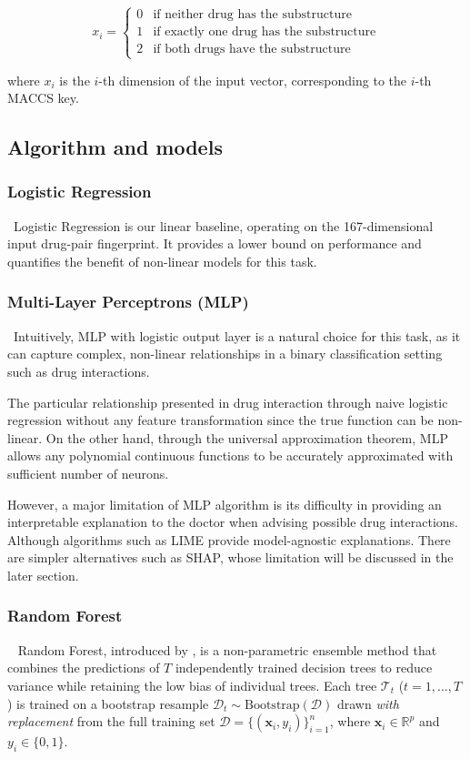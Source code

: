 \documentclass[letterpaper]{article} %
\begin{document}
\begin{equation}
    x_i = \begin{cases}
        0 & \text{if neither drug has the substructure} \\
        1 & \text{if exactly one drug has the substructure} \\
        2 & \text{if both drugs have the substructure} 
        \end{cases}
\end{equation}

where $x_i$ is the $i$-th dimension of the input vector, corresponding to the $i$-th MACCS key. 

\subsection{Algorithm and models}

\subsubsection{Logistic Regression}
\
Logistic Regression is our linear baseline, operating on the 167-dimensional input drug-pair fingerprint. It provides a lower bound on performance and quantifies the benefit of non-linear models for this task.

\subsubsection{Multi-Layer Perceptrons (MLP)}
\ 
Intuitively, MLP with logistic output layer is a natural choice for this task, as it can capture complex, non-linear relationships in a binary classification setting such as drug interactions.

The particular relationship presented in drug interaction through naive logistic regression without any feature transformation since the true function can be non-linear. On the other hand, through the universal approximation theorem, MLP allows any polynomial continuous functions to be accurately approximated with sufficient number of neurons.

However, a major limitation of MLP algorithm is its difficulty in providing an interpretable explanation to the doctor when advising possible drug interactions. Although algorithms such as LIME provide model-agnostic explanations. There are simpler alternatives such as SHAP, whose limitation will be discussed in the later section.

\subsubsection{Random Forest}
\
\newline
Random Forest, introduced by \citet{Breiman2001}, is a non-parametric ensemble method that combines the predictions of $T$ independently trained decision trees to reduce variance while retaining the low bias of individual trees. Each tree $\mathcal{T}_t$ ($t = 1, \ldots, T$) is trained on a bootstrap resample $\mathcal{D}_t \sim \text{Bootstrap}(\mathcal{D})$ drawn \emph{with replacement} from the full training set $\mathcal{D} = \{(\mathbf{x}_i, y_i)\}_{i=1}^{n}$, where $\mathbf{x}_i \in \mathbb{R}^{p}$ and $y_i \in \{0, 1\}$.
 
\end{document}
